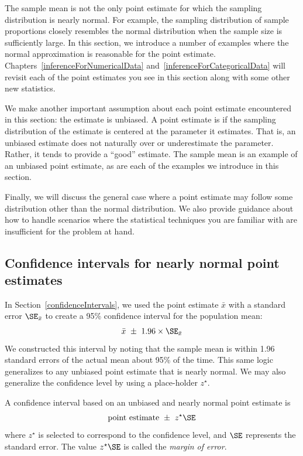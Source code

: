 The sample mean is not the only point estimate for which the sampling distribution is nearly normal. For example, the sampling distribution of sample proportions closely resembles the normal distribution when the sample size is sufficiently large. In this section, we introduce a number of examples where the normal approximation is reasonable for the point estimate. Chapters~\ref{inferenceForNumericalData} and~\ref{inferenceForCategoricalData} will revisit each of the point estimates you see in this section along with some other new statistics.

We make another important assumption about each point estimate encountered in this section: the estimate is unbiased. A point estimate is  if the sampling distribution of the estimate is centered at the parameter it estimates. That is, an unbiased estimate does not naturally over or underestimate the parameter. Rather, it tends to provide a ``good'' estimate. The sample mean is an example of an unbiased point estimate, as are each of the examples we introduce in this section.

Finally, we will discuss the general case where a point estimate may follow some distribution other than the normal distribution. We also provide guidance about how to handle scenarios where the statistical techniques you are familiar with are insufficient for the problem at hand.


\subsection{Confidence intervals for nearly normal point estimates}


In Section~\ref{confidenceIntervals}, we used the point estimate $\bar{x}$ with a standard error $\SE_{\bar{x}}$ to create a 95\% confidence interval for the population mean:
\begin{align}
\bar{x}\ \pm\ 1.96 \times \SE_{\bar{x}}
\label{95PercCIForMeanInGeneralizingSection}
\end{align}
We constructed this interval by noting that the sample mean is within 1.96 standard errors of the actual mean about 95\% of the time. This same logic generalizes to any unbiased point estimate that is nearly normal. We may also generalize the confidence level by using a place-holder $z^{\star}$.

\begin{termBox}{\label{generalConfidenceIntervalTermBox}%
A confidence interval based on an unbiased and nearly normal point estimate is
\begin{eqnarray}
\text{point estimate}\ \pm\ z^{\star}\SE
\label{95PercGeneralCIInGeneralizingSection}
\end{eqnarray}
where $z^{\star}$ is selected to correspond to the confidence level, and $\SE$ represents the standard error. The value $z^{\star}\SE$ is called the \emph{margin of error}.}
\end{termBox}

